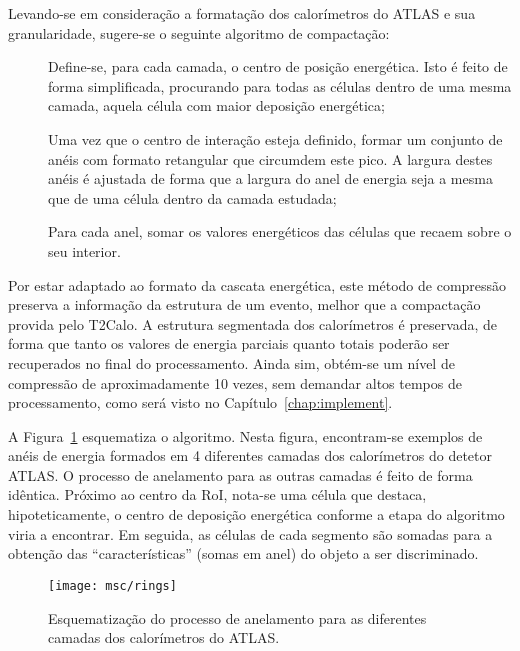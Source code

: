 Levando-se em consideração a formatação dos calorímetros do ATLAS e sua
granularidade, sugere-se o seguinte algoritmo de compactação:

\begin{description}
\item[] Define-se, para cada camada, o centro de posição
energética. Isto é feito de forma simplificada, procurando para todas as
células dentro de uma mesma camada, aquela célula com maior deposição
energética;
\item[] Uma vez que o centro de interação esteja definido, formar um
conjunto de anéis com formato retangular que circumdem este pico. A largura
destes anéis é ajustada de forma que a largura do anel de energia seja a mesma
que de uma célula dentro da camada estudada;
\item[] Para cada anel, somar os valores energéticos das células que
recaem sobre o seu interior.
\end{description}

Por estar adaptado ao formato da cascata energética, este método de compressão
preserva a informação da estrutura de um evento, melhor que a compactação
provida pelo T2Calo. A estrutura segmentada dos calorímetros é preservada, de
forma que tanto os valores de energia parciais quanto totais poderão ser
recuperados no final do processamento. Ainda sim, obtém-se um nível de
compressão de aproximadamente 10 vezes, sem demandar altos tempos de
processamento, como será visto no Capítulo~\ref{chap:implement}.

A Figura~\ref{fig:rings} esquematiza o algoritmo. Nesta figura, encontram-se
exemplos de anéis de energia formados em 4 diferentes camadas dos calorímetros
do detetor ATLAS. O processo de anelamento para as outras camadas é feito de
forma idêntica. Próximo ao centro da RoI, nota-se uma célula que destaca,
hipoteticamente, o centro de deposição energética conforme a etapa 
do algoritmo viria a encontrar. Em seguida, as células de cada segmento são
somadas para a obtenção das ``características'' (somas em anel) do objeto a
ser discriminado.

\begin{figure}
\begin{center}
\texttt{[image: msc/rings]}
\end{center}
\caption{Esquematização do processo de anelamento para as diferentes camadas
dos calorímetros do ATLAS.}
\label{fig:rings}
\end{figure}

